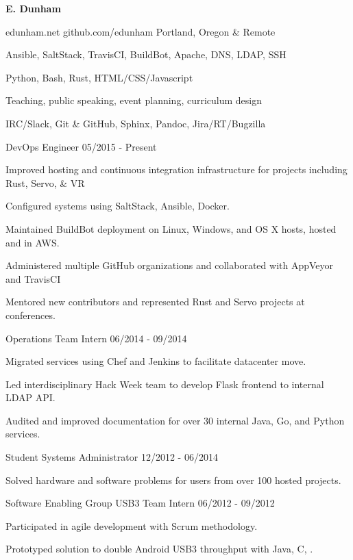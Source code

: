 \documentclass[11pt]{article} %
\begin{document}
\centerline{{\Huge \bf E. Dunham}}

\bigskip

        {edunham.net}
        {github.com/edunham}
        {Portland, Oregon \& Remote}


      {Ansible, SaltStack, TravisCI, BuildBot, Apache, DNS, LDAP, SSH}

      {Python, Bash, Rust, HTML/CSS/Javascript}

      {Teaching, public speaking, event planning, curriculum design}

      {IRC/Slack, Git \& GitHub, Sphinx, Pandoc, Jira/RT/Bugzilla}



\begin{description}
\squish
{}
           {DevOps Engineer}
           {05/2015 - Present}

Improved hosting and continuous integration infrastructure for projects
including Rust, Servo, \& VR

Configured systems using SaltStack, Ansible, Docker.

Maintained BuildBot deployment on Linux, Windows, and OS X hosts, hosted and
in AWS.


Administered multiple GitHub organizations and collaborated with AppVeyor and
TravisCI

Mentored new contributors and represented Rust and Servo projects at
conferences.

           {Operations Team Intern}
           {06/2014 - 09/2014}

Migrated services using Chef and Jenkins to facilitate datacenter move.

Led interdisciplinary Hack Week team to develop Flask frontend to internal
LDAP API.

Audited and improved documentation for over 30 internal Java, Go, and Python
services.

           {Student Systems Administrator}
           {12/2012 - 06/2014}

Solved hardware and software problems for users from over 100 hosted projects.

           {Software Enabling Group USB3 Team Intern}
           {06/2012 - 09/2012}

Participated in agile development with Scrum methodology.

Prototyped solution to double Android USB3 throughput with Java, C, \CPP.

\end{description}
\end{document}
